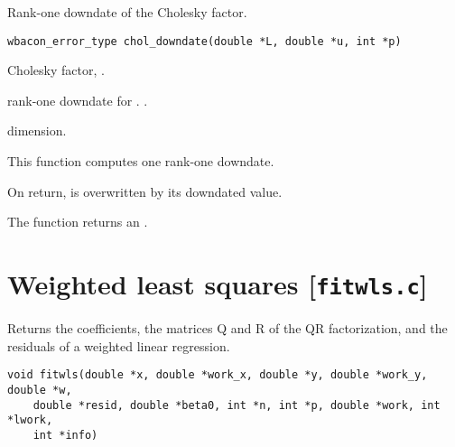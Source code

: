 \documentclass[a4paper,oneside,10pt,DIV=12]{scrreprt}
\begin{document}
\begin{Description}
Rank-one downdate of the Cholesky factor.
\end{Description}
\begin{Usage}
\begin{verbatim}
wbacon_error_type chol_downdate(double *L, double *u, int *p)
\end{verbatim}
\end{Usage}
\begin{Arguments}
	\begin{ldescription}
		\item[\code{L}] Cholesky factor, .
		\item[\code{u}] rank-one downdate for .
			.
		\item[\code{p}] dimension.
	\end{ldescription}
\end{Arguments}
\begin{Details}
This function computes one rank-one downdate. 
\end{Details}
\begin{Value}
On return,  is overwritten by its downdated value. 

The function returns an .
\end{Value}


\chapter{Weighted least squares [\texttt{fitwls.c}]}
\begin{Description}
	Returns the coefficients, the matrices Q and R of the QR factorization, and
	the residuals of a weighted linear regression.
\end{Description}
\begin{Usage}
\begin{verbatim}
void fitwls(double *x, double *work_x, double *y, double *work_y, double *w,
    double *resid, double *beta0, int *n, int *p, double *work, int *lwork,
    int *info)
\end{verbatim}
\end{Usage}
\end{document}
